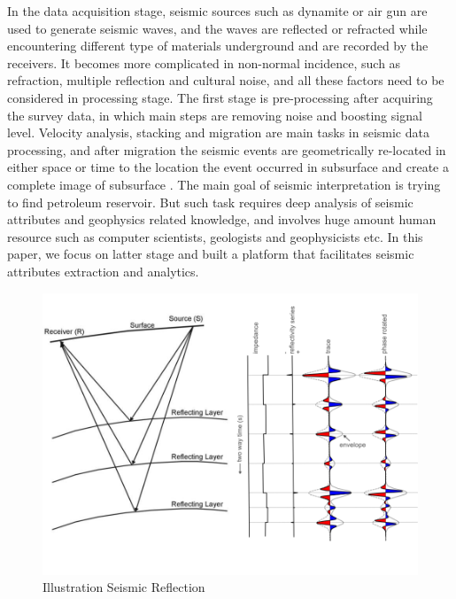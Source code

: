 In the data acquisition stage, seismic sources such as dynamite or air gun are used to generate seismic waves, and the waves are reflected or refracted while encountering different type of materials underground and are recorded by the receivers. It becomes more complicated in non-normal incidence, such as refraction, multiple reflection and cultural noise, and all these factors need to be considered in processing stage. The first stage is pre-processing after acquiring the survey data, in which main steps are removing noise and boosting signal level. Velocity analysis, stacking and migration are main tasks in seismic data processing, and after migration the seismic events are geometrically re-located in either space or time to the location the event occurred in subsurface and create a complete image of subsurface \cite{seisreflectionwiki}. The main goal of seismic interpretation is trying to find petroleum reservoir. But such task requires deep analysis of seismic attributes and geophysics related knowledge, and involves huge amount human resource such as computer scientists, geologists and geophysicists etc. In this paper, we focus on latter stage and built a platform that facilitates seismic attributes extraction and analytics.   

\begin{figure}[h]
\centering
\includegraphics[scale=0.4]{figures/seismic_reflection_principal.png}
\caption{Illustration Seismic Reflection \cite{seisreflectionepa} \cite{seisreflectionagile}}
\label{seismic_reflection}
\end{figure}



